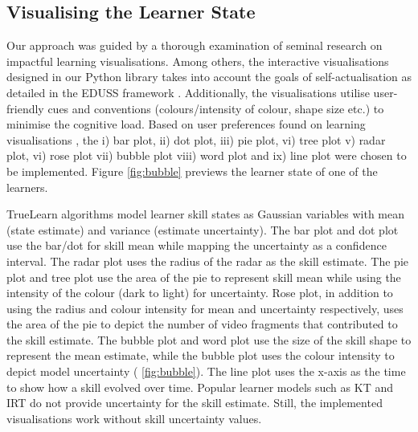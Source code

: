 \documentclass[letterpaper]{article} %
\begin{document}
\subsection{Visualising the Learner State}

Our approach was guided by a thorough examination of seminal research on impactful learning visualisations. Among others, the interactive visualisations designed in our Python library takes into account the goals of self-actualisation as detailed in the EDUSS framework \cite{mti6060042}. 
Additionally, the visualisations utilise user-friendly cues and conventions (colours/intensity of colour, shape size etc.) to minimise the cognitive load. 
Based on user preferences found on learning visualisations \cite{visualisationscomparison}, the i) bar plot, ii) dot plot, iii) pie plot, vi) tree plot v) radar plot, vi) rose plot vii) bubble plot viii) word plot and ix) line plot were chosen to be implemented. Figure \ref{fig:bubble} previews the learner state of one of the learners. 

TrueLearn algorithms model learner skill states as Gaussian variables with mean (state estimate) and variance (estimate uncertainty). The bar plot and dot plot use the bar/dot for skill mean while mapping the uncertainty as a confidence interval. The radar plot uses the radius of the radar as the skill estimate. The pie plot and tree plot use the area of the pie to represent skill mean while using the intensity of the colour (dark to light) for uncertainty. Rose plot, in addition to using the radius and colour intensity for mean and uncertainty respectively, uses the area of the pie to depict the number of video fragments that contributed to the skill estimate. The bubble plot and word plot use the size of the skill shape to represent the mean estimate, while the bubble plot uses the colour intensity to depict model uncertainty (\figurename{ \ref{fig:bubble}}). The line plot uses the x-axis as the time to show how a skill evolved over time. Popular learner models such as KT and IRT do not provide uncertainty for the skill estimate. Still, the implemented visualisations work without skill uncertainty values. 
\end{document}
